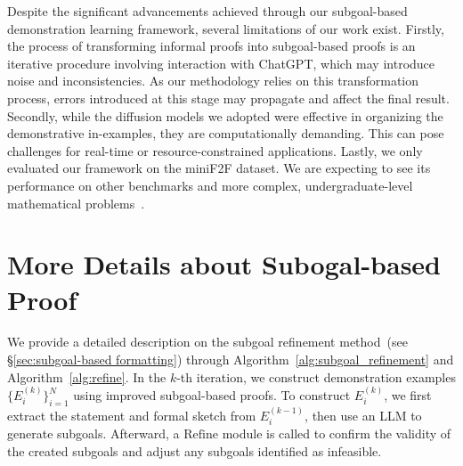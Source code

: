 \documentclass{article}
\begin{document}
Despite the significant advancements achieved through our subgoal-based demonstration learning framework, several limitations of our work exist. Firstly, the process of transforming informal proofs into subgoal-based proofs is an iterative procedure involving interaction with ChatGPT, which may introduce noise and inconsistencies. As our methodology relies on this transformation process, errors introduced at this stage may propagate and affect the final result.
Secondly, while the diffusion models we adopted were effective in organizing the demonstrative in-examples, they are computationally demanding. This can pose challenges for real-time or resource-constrained applications.
Lastly, we only evaluated our framework on the miniF2F dataset. We are expecting to see its performance on other benchmarks and more complex, undergraduate-level mathematical problems~\cite{azerbayev2023proofnet}. 















\clearpage
\appendix
\section{More Details about Subogal-based Proof}
\label{sec:appendix_subgoal}

We provide a detailed description on the subgoal refinement method~(see §\ref{sec:subgoal-based formatting}) through Algorithm~\ref{alg:subgoal_refinement} and Algorithm~\ref{alg:refine}. In the $k$-th iteration, we construct demonstration examples $\{E_i^{(k)}\}_{i=1}^{N}$ using improved subgoal-based proofs. To construct $E_i^{(k)}$, we first extract the statement and formal sketch from $E_i^{(k-1)}$, then use an LLM to generate subgoals. Afterward, a $\mathrm{Refine}$ module is called to confirm the validity of the created subgoals and adjust any subgoals identified as infeasible.
\end{document}
